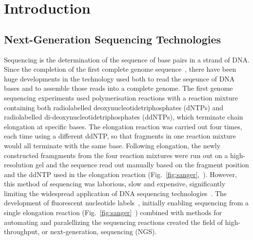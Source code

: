 \section{Introduction}
\subsection{Next-Generation Sequencing Technologies}
Sequencing is the determination of the sequence of base pairs in a strand of DNA. Since the completion of the first complete genome sequence~\cite{sanger1977}, there have been huge developments in the technology used both to read the seqeunce of DNA bases and to assemble those reads into a complete genome. The first genome sequencing experiments used polymerisation reactions with a reaction mixture containing both radiolabelled deoxynucleotidetriphosphates (dNTPs) and radiolabelled di-deoxynucleotidetriphosphates (ddNTPs), which terminate chain elongation at specific bases. The elongation reaction was carried out four times, each time using a different ddNTP, so that fragments in one reaction mixture would all terminate with the same base. Following elongation, the newly constructed framgments from the four reaction mixtures were run out on a high-resolution gel and the sequence read out manually based on the fragment position and the ddNTP used in the elongation reaction (Fig.~\ref{fig:sanger},~\cite{sanger1977}). However, this method of sequencing was laborious, slow and expensive, significantly limiting the widespread application of DNA sequencing technologies~\cite{metzker2005}. The development of fluorescent nucleotide labels~\cite{Smith1985}, initially enabling sequencing from a single elongation reaction (Fig.~\ref{fig:sanger}~\cite{Smith1986}) combined with methods for automating and paralellizing the sequencing reactions created the field of high-throughput, or next-generation, sequencing (NGS).


